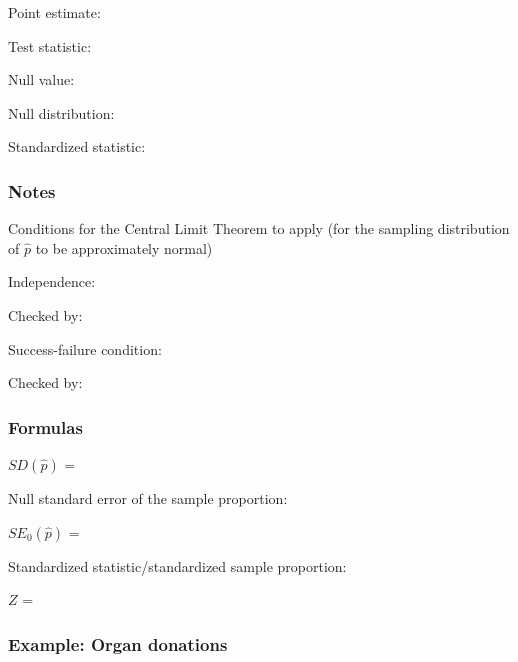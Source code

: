 \documentclass[
]{report}
\newcommand{\rgs}{\vspace{12pt}} %
\newcommand{\rgi}{\hspace{24pt}}  %
\begin{document}
Point estimate:
\rgs

Test statistic:
\rgs

Null value:
\rgs

Null distribution:
\rgs

Standardized statistic:
\rgs

\hypertarget{notes-17}{%
\subsubsection*{Notes}\label{notes-17}}

Conditions for the Central Limit Theorem to apply (for the sampling distribution of \(\hat{p}\) to be approximately normal)

\rgi Independence:
\rgs

\rgi \rgi Checked by:
\rgs

\rgi Success-failure condition:
\rgs

\rgi \rgi Checked by:
\rgs

\hypertarget{formulas-2}{%
\subsubsection*{Formulas}\label{formulas-2}}

\(SD(\hat{p})\) =
\rgs

Null standard error of the sample proportion:

\(SE_0(\hat{p})\) =
\rgs

Standardized statistic/standardized sample proportion:

\(Z\) =
\rgs

\hypertarget{example-organ-donations}{%
\subsubsection*{Example: Organ donations}\label{example-organ-donations}}
\end{document}
